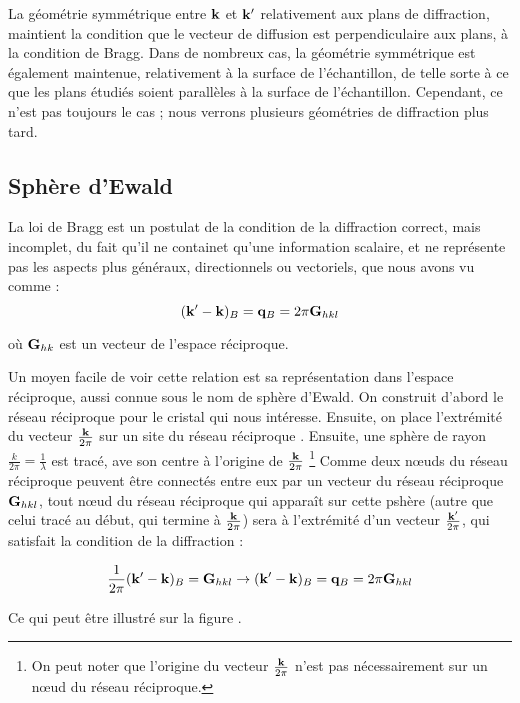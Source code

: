 La géométrie symmétrique entre $\mathbf{k}$ et $\mathbf{k'}$ relativement aux
plans de diffraction, maintient la condition que le vecteur de diffusion est
perpendiculaire aux plans, à la condition de Bragg. Dans de nombreux cas, la
géométrie symmétrique est également maintenue, relativement à la surface de
l'échantillon, de telle sorte à ce que les plans étudiés soient parallèles à la
surface de l'échantillon. Cependant, ce n'est pas toujours le cas ; nous verrons
plusieurs géométries de diffraction plus tard.

\subsection{Sphère d'Ewald}

La loi de Bragg est un postulat de la condition de la diffraction correct, mais
incomplet, du fait qu'il ne containet qu'une information scalaire, et ne
représente pas les aspects plus généraux, directionnels ou vectoriels, que nous
avons vu comme :
\begin{equation}
    (\mathbf{k'-k})_B = \mathbf{q}_B = 2\pi \mathbf{G}_{hkl}
\end{equation}

où $\mathbf{G}_{hk}$ est un vecteur de l'espace réciproque.

Un moyen facile de voir cette relation est sa représentation dans l'espace
réciproque, aussi connue sous le nom de sphère d'Ewald. On construit d'abord le
réseau réciproque pour le cristal qui nous intéresse. Ensuite, on place
l'extrémité du vecteur $\frac{\mathbf{k}}{2\pi}$ sur un site du réseau réciproque
. Ensuite, une sphère de rayon $\frac{k}{2\pi} = \frac{1}{\lambda}$ est tracé,
ave son centre à l'origine de $\frac{\mathbf{k}}{2\pi}$
\footnote{On peut noter que l'origine du vecteur $\frac{\mathbf{k}}{2\pi}$ n'est
pas nécessairement sur un nœud du réseau réciproque.}
Comme deux nœuds du réseau réciproque peuvent être connectés entre eux par un
vecteur du réseau réciproque $\mathbf{G}_{hkl}$, tout nœud du réseau réciproque
qui apparaît sur cette pshère (autre que celui tracé au début, qui termine à
$\frac{\mathbf{k}}{2\pi}$) sera à l'extrémité d'un vecteur
$\frac{\mathbf{k'}}{2\pi}$, qui satisfait la condition de la diffraction :

\begin{equation}
    \frac{1}{2\pi} (\mathbf{k'-k})_B = \mathbf{G}_{hkl} \rightarrow
    (\mathbf{k'-k})_B = \mathbf{q}_B = 2 \pi \mathbf{G}_{hkl}
\end{equation}

Ce qui peut être illustré sur la figure \TODO.

